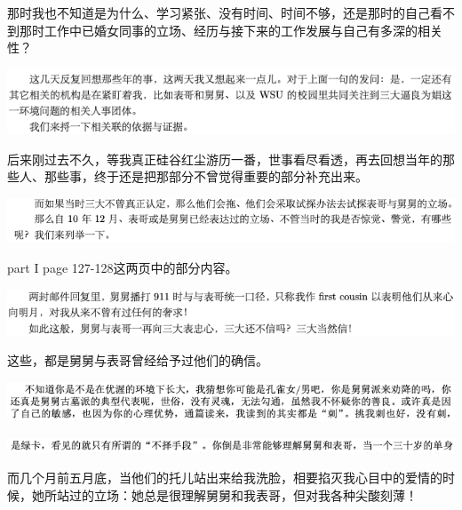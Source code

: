 \documentclass[9pt, b5paper]{article}
\begin{document}
那时我也不知道是为什么、学习紧张、没有时间、时间不够，还是那时的自己看不到那时工作中已婚女同事的立场、经历与接下来的工作发展与自己有多深的相关性？

\begin{center}
\includegraphics[width=.9\linewidth]{./pic/backups_plans_20210424_094006.png}
\end{center}

后来刚过去不久，等我真正硅谷红尘游历一番，世事看尽看透，再去回想当年的那些人、那些事，终于还是把那部分不曾觉得重要的部分补充出来。

\begin{center}
\includegraphics[width=.9\linewidth]{./pic/backups_plans_20210424_102201.png}
\end{center}

part I page 127-128这两页中的部分内容。

\begin{center}
\includegraphics[width=.9\linewidth]{./pic/backups_plans_20210424_102322.png}
\end{center}

这些，都是舅舅与表哥曾经给予过他们的确信。

\begin{center}
\includegraphics[width=.9\linewidth]{./pic/backups_plans_20210424_102504.png}
\end{center}

\begin{center}
\includegraphics[width=.9\linewidth]{./pic/backups_plans_20210424_102530.png}
\end{center}

而几个月前五月底，当他们的托儿站出来给我洗脸，相要掐灭我心目中的爱情的时候，她所站过的立场：她总是很理解舅舅和我表哥，但对我各种尖酸刻薄！
\end{document}
